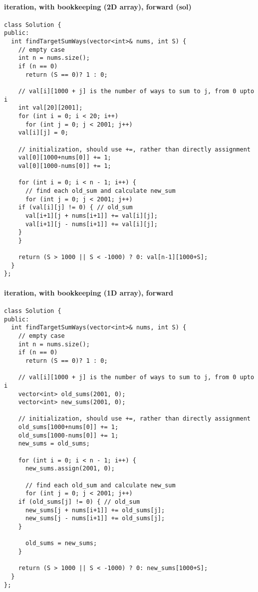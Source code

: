 \documentclass[11pt]{article}
\begin{document}
\paragraph{iteration, with bookkeeping (2D array), forward (sol)}
\label{sec:org4e7f48b}
\begin{verbatim}
class Solution {
public:
  int findTargetSumWays(vector<int>& nums, int S) {
    // empty case 
    int n = nums.size();
    if (n == 0)
      return (S == 0)? 1 : 0;

    // val[i][1000 + j] is the number of ways to sum to j, from 0 upto i
    int val[20][2001];
    for (int i = 0; i < 20; i++)
      for (int j = 0; j < 2001; j++)
	val[i][j] = 0;

    // initialization, should use +=, rather than directly assignment    
    val[0][1000+nums[0]] += 1;
    val[0][1000-nums[0]] += 1;

    for (int i = 0; i < n - 1; i++) {
      // find each old_sum and calculate new_sum
      for (int j = 0; j < 2001; j++)
	if (val[i][j] != 0) { // old_sum
	  val[i+1][j + nums[i+1]] += val[i][j];
	  val[i+1][j - nums[i+1]] += val[i][j];
	} 
    }

    return (S > 1000 || S < -1000) ? 0: val[n-1][1000+S];
  }
};
\end{verbatim}
\paragraph{iteration, with bookkeeping (1D array), forward}
\label{sec:org2d27407}
\begin{verbatim}
class Solution {
public:
  int findTargetSumWays(vector<int>& nums, int S) {
    // empty case 
    int n = nums.size();
    if (n == 0)
      return (S == 0)? 1 : 0;

    // val[i][1000 + j] is the number of ways to sum to j, from 0 upto i
    vector<int> old_sums(2001, 0);
    vector<int> new_sums(2001, 0);

    // initialization, should use +=, rather than directly assignment    
    old_sums[1000+nums[0]] += 1;
    old_sums[1000-nums[0]] += 1;
    new_sums = old_sums;

    for (int i = 0; i < n - 1; i++) {
      new_sums.assign(2001, 0);

      // find each old_sum and calculate new_sum
      for (int j = 0; j < 2001; j++)
	if (old_sums[j] != 0) { // old_sum
	  new_sums[j + nums[i+1]] += old_sums[j];
	  new_sums[j - nums[i+1]] += old_sums[j];
	}

      old_sums = new_sums;
    }

    return (S > 1000 || S < -1000) ? 0: new_sums[1000+S];
  }
};
\end{verbatim}
\end{document}
